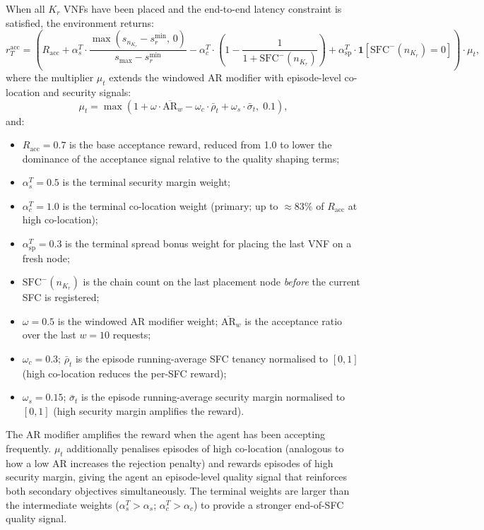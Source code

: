 When all $K_r$ VNFs have been placed and the end-to-end latency constraint is satisfied, the environment returns:
\begin{equation}
r_T^{\text{acc}} = \left(
  R_{\text{acc}}
  + \alpha_s^T \cdot \frac{\max\!\left(s_{n_{K_r}} - s_r^{\min},\, 0\right)}{s_{\max} - s_r^{\min}}
  - \alpha_c^T \cdot \left(1 - \frac{1}{1 + \text{SFC}^{-}(n_{K_r})}\right)
  + \alpha_{\text{sp}}^T \cdot \mathbf{1}\!\left[\text{SFC}^{-}(n_{K_r}) = 0\right]
\right) \cdot \mu_t,
\end{equation}
where the multiplier $\mu_t$ extends the windowed AR modifier with episode-level co-location and security signals:
\begin{equation}
\mu_t = \max\!\left(1 + \omega \cdot \overline{\text{AR}}_w - \omega_c \cdot \bar{\rho}_t + \omega_s \cdot \bar{\sigma}_t,\; 0.1\right),
\end{equation}
and:
\begin{itemize}
  \item $R_{\text{acc}} = 0.7$ is the base acceptance reward, reduced from 1.0 to lower the dominance of the acceptance signal relative to the quality shaping terms;
  \item $\alpha_s^T = 0.5$ is the terminal security margin weight;
  \item $\alpha_c^T = 1.0$ is the terminal co-location weight (primary; up to $\approx\!83\%$ of $R_{\text{acc}}$ at high co-location);
  \item $\alpha_{\text{sp}}^T = 0.3$ is the terminal spread bonus weight for placing the last VNF on a fresh node;
  \item $\text{SFC}^{-}(n_{K_r})$ is the chain count on the last placement node \emph{before} the current SFC is registered;
  \item $\omega = 0.5$ is the windowed AR modifier weight; $\overline{\text{AR}}_w$ is the acceptance ratio over the last $w = 10$ requests;
  \item $\omega_c = 0.3$; $\bar{\rho}_t$ is the episode running-average SFC tenancy normalised to $[0,1]$ (high co-location reduces the per-SFC reward);
  \item $\omega_s = 0.15$; $\bar{\sigma}_t$ is the episode running-average security margin normalised to $[0,1]$ (high security margin amplifies the reward).
\end{itemize}
The AR modifier amplifies the reward when the agent has been accepting frequently. $\mu_t$ additionally penalises episodes of high co-location (analogous to how a low AR increases the rejection penalty) and rewards episodes of high security margin, giving the agent an episode-level quality signal that reinforces both secondary objectives simultaneously. The terminal weights are larger than the intermediate weights ($\alpha_s^T > \alpha_s$; $\alpha_c^T > \alpha_c$) to provide a stronger end-of-SFC quality signal.

